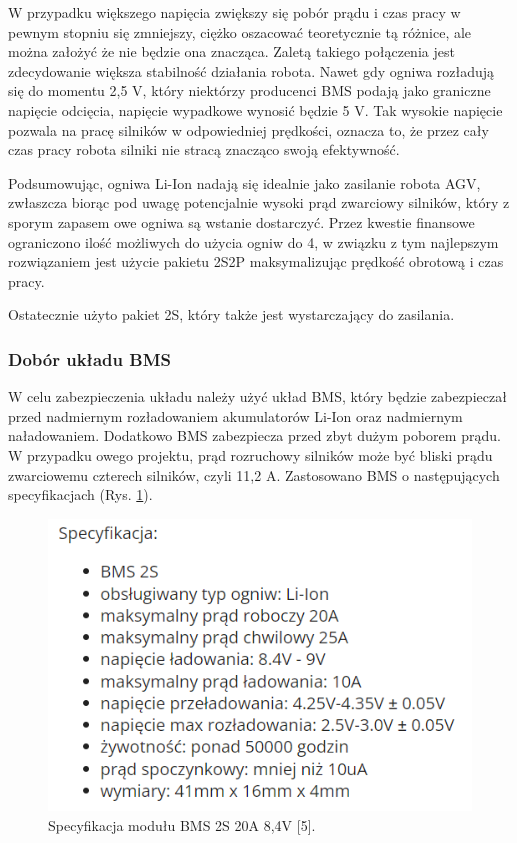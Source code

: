 \documentclass{report}
\begin{document}
\begin{enumerate}[label=(\Alph*)]
    W przypadku większego napięcia zwiększy się pobór prądu i czas pracy w pewnym stopniu się zmniejszy, ciężko oszacować teoretycznie tą różnice, ale można założyć że nie będzie ona znacząca. Zaletą takiego połączenia jest zdecydowanie większa stabilność działania robota. Nawet gdy ogniwa rozładują się do momentu 2,5 V, który niektórzy producenci BMS podają jako graniczne napięcie odcięcia, napięcie wypadkowe wynosić będzie 5 V. Tak wysokie napięcie pozwala na pracę silników w odpowiedniej prędkości, oznacza to, że przez cały czas pracy robota silniki nie stracą znacząco swoją efektywność.
    
    Podsumowując, ogniwa Li-Ion nadają się idealnie jako zasilanie robota AGV, zwłaszcza biorąc pod uwagę potencjalnie wysoki prąd zwarciowy silników, który z sporym zapasem owe ogniwa są wstanie dostarczyć. Przez kwestie finansowe ograniczono ilość możliwych do użycia ogniw do 4, w związku z tym najlepszym rozwiązaniem jest użycie pakietu 2S2P maksymalizując prędkość obrotową i czas pracy.

    Ostatecznie użyto pakiet 2S, który także jest wystarczający do zasilania.
\end{enumerate}

\subsubsection{Dobór układu BMS}

W celu zabezpieczenia układu należy użyć układ BMS, który będzie zabezpieczał przed nadmiernym rozładowaniem akumulatorów Li-Ion oraz nadmiernym naładowaniem. Dodatkowo BMS zabezpiecza przed zbyt dużym poborem prądu. W przypadku owego projektu, prąd rozruchowy silników może być bliski prądu zwarciowemu czterech silników, czyli 11,2 A. Zastosowano BMS o następujących specyfikacjach (Rys. \ref{fig:spec-BMS}).

\begin{figure}[H]
    \centering
    \includegraphics{src/tech_specifications/BMS 2S 20A 8.4V.png}
    \caption{Specyfikacja modułu BMS 2S 20A 8,4V [5].}
    \label{fig:spec-BMS}
\end{figure}
\end{document}
